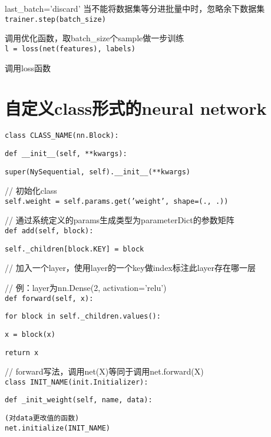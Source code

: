\documentclass[UTF8]{ctexart}
\begin{document}
  last\_batch='discard' 当不能将数据集等分进批量中时，忽略余下数据集\\
\texttt{trainer.step(batch\_size)}

  调用优化函数，取batch\_size个sample做一步训练\\
\texttt{l = loss(net(features), labels)}

  调用loss函数

\section{自定义class形式的neural network}
\noindent \texttt{class CLASS\_NAME(nn.Block):}

  \texttt{def \_\_init\_\_(self, **kwargs):}

  \quad \texttt{super(NySequential, self).\_\_init\_\_(**kwargs)}

  // 初始化class\\

  \quad \texttt{self.weight = self.params.get('weight', shape=(., .))}

  // 通过系统定义的params生成类型为parameterDict的参数矩阵\\

  \texttt{def add(self, block):}

  \quad \texttt{self.\_children[block.KEY] = block}

  // 加入一个layer，使用layer的一个key做index标注此layer存在哪一层

  // 例：layer为nn.Dense(2, activation='relu')\\

  \texttt{def forward(self, x):}

  \quad \texttt{for block in self.\_children.values():}

  \quad \quad \texttt{x = block(x)}

  \quad \quad \texttt{return x}

  // forward写法，调用net(X)等同于调用net.forward(X)\\
\texttt{class INIT\_NAME(init.Initializer):}

  \texttt{def \_init\_weight(self, name, data):}

  \quad \texttt{(对data更改值的函数)}\\
\texttt{net.initialize(INIT\_NAME)}
\end{document}
